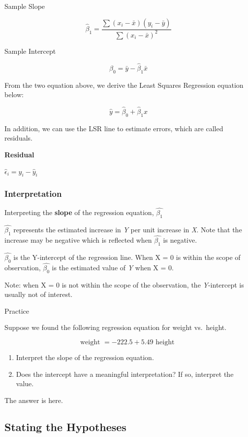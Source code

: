 \documentclass[
]{article}
\providecommand{\tightlist}{%
  \setlength{\itemsep}{0pt}\setlength{\parskip}{0pt}}
\begin{document}
Sample Slope

\[
\hat{\beta}_1=\dfrac{\sum (x_i-\bar{x})(y_i-\bar{y})}{\sum (x_i-\bar{x})^2}
\]

Sample Intercept

\[
\hat{\beta}_0=\bar{y}-\hat{\beta}_1\bar{x}
\]

From the two equation above, we derive the Least Squares Regression equation below:

\[
\hat{y}=\hat{\beta}_0+\hat{\beta}_1x
\]

In addition, we can use the LSR line to estimate errors, which are called residuals.

\textbf{Residual}

\(\hat{\epsilon}_i=y_i-\hat{y}_i\)

\hypertarget{interpretation-1}{%
\subsubsection{Interpretation}\label{interpretation-1}}

Interpreting the \textbf{slope} of the regression equation, \(\hat{\beta_1}\)

\(\hat{\beta_1}\) represents the estimated increase in \emph{Y} per unit increase in \emph{X}. Note that the increase may be negative which is reflected when \(\hat{\beta_1}\) is negative.

\(\hat{\beta_0}\) is the Y-intercept of the regression line. When X = 0 is within the scope of observation, \(\hat{\beta_0}\) is the estimated value of \emph{Y} when X = 0.

Note: when X = 0 is not within the scope of the observation, the \emph{Y}-intercept is usually not of interest.

Practice

Suppose we found the following regression equation for weight vs.~height.

\[
\text{weight }=-222.5 +5.49\text{ height }
\]

\begin{enumerate}
\def\labelenumi{\arabic{enumi}.}
\tightlist
\item
  Interpret the slope of the regression equation.
\item
  Does the intercept have a meaningful interpretation? If so, interpret the value.
\end{enumerate}

The answer is here.

\hypertarget{stating-the-hypotheses-1}{%
\subsection{Stating the Hypotheses}\label{stating-the-hypotheses-1}}
\end{document}
